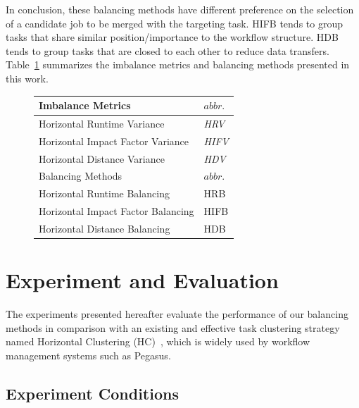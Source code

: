 \documentclass[final]{IEEEtran}
\begin{document}
In conclusion, these balancing methods have different preference on the selection of a candidate job to be merged with the targeting task. HIFB tends to group tasks that share similar position/importance to the workflow structure. HDB tends to group tasks that are closed to each other to reduce data transfers. Table~\ref{tab:2} summarizes the imbalance metrics and balancing methods presented in this work. 

\begin{figure}[htb]
	\centering
	\begin{tabular}{l|l}
		\hline
		Imbalance Metrics & $abbr.$   \\
		\hline
		Horizontal Runtime Variance & \emph{HRV}   \\ 
		Horizontal Impact Factor Variance & \emph{HIFV} \\ 
		Horizontal Distance Variance & \emph{HDV}  \\ 
		\hline
		Balancing Methods & $abbr.$  \\
		\hline
		Horizontal Runtime Balancing & HRB   \\ 
		Horizontal Impact Factor Balancing & HIFB\\ 
		Horizontal Distance Balancing & HDB \\ 
		\hline
	\end{tabular}
	\label{tab:2}
\end{figure}



\section{Experiment and Evaluation}
\label{sec:experiments}

The experiments presented hereafter evaluate the performance of our balancing methods in comparison with an existing and effective task clustering strategy named Horizontal Clustering (HC)~\cite{Singh:2008:WTC:1341811.1341822}, which is widely used by workflow management systems such as Pegasus. 

\subsection{Experiment Conditions}
\end{document}
